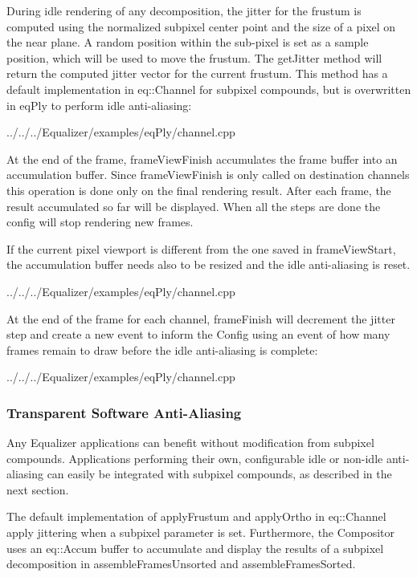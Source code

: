 \documentclass[10pt,a4]{scrartcl}
\begin{document}
During idle rendering of any decomposition, the jitter for the frustum is
computed using the normalized subpixel center point and the size of a pixel on
the near plane. A random position within the sub-pixel is set as a sample
position, which will be used to move the frustum. The \textsf{getJitter} method
will return the computed jitter vector for the current frustum. This method has
a default implementation in \textsf{eq::Channel} for subpixel compounds, but is
overwritten in \textsf{eqPly} to perform idle anti-aliasing:

{\footnotesize
  {../../../Equalizer/examples/eqPly/channel.cpp}}

At the end of the frame, \textsf{frameViewFinish} accumulates the frame buffer
into an accumulation buffer. Since \textsf{frameViewFinish} is only called on
destination channels this operation is done only on the final rendering
result. After each frame, the result accumulated so far will be displayed. When
all the steps are done the config will stop rendering new frames.

If the current pixel viewport is different from the one saved in
\textsf{frameViewStart}, the accumulation buffer needs also to be resized and
the idle anti-aliasing is reset.

{\footnotesize
  {../../../Equalizer/examples/eqPly/channel.cpp}}

At the end of the frame for each channel, \textsf{frameFinish} will decrement
the jitter step and create a new event to inform the \textsf{Config} using an
event of how many frames remain to draw before the idle anti-aliasing is
complete:

{\footnotesize
  {../../../Equalizer/examples/eqPly/channel.cpp}}

\subsubsection{Transparent Software Anti-Aliasing}

Any Equalizer applications can benefit without modification from subpixel
compounds. Applications performing their own, configurable idle or non-idle
anti-aliasing can easily be integrated with subpixel compounds, as described in
the next section.

The default implementation of \textsf{applyFrustum} and \textsf{applyOrtho} in
\textsf{eq::Channel} apply jittering when a subpixel parameter is set.
Furthermore, the \textsf{Compositor} uses an \textsf{eq::Accum} buffer to
accumulate and display the results of a subpixel decomposition in \textsf{assembleFramesUnsorted} and \textsf{assembleFramesSorted}.
\end{document}
